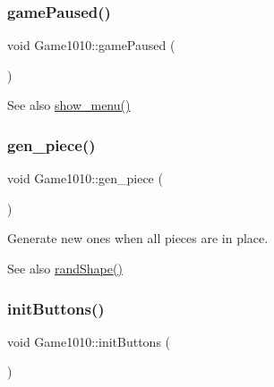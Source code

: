 \subsubsection{\texorpdfstring{game\+Paused()}{gamePaused()}}
{\footnotesize\ttfamily void Game1010\+::game\+Paused (\begin{DoxyParamCaption}{ }\end{DoxyParamCaption})\hspace{0.3cm}{\ttfamily [inline]}}

\begin{DoxySeeAlso}{See also}
\mbox{\hyperlink{class_game1010_a99d6f53c3073861fe37ef67caa073840}{show\+\_\+menu()}} 
\end{DoxySeeAlso}
\mbox{\label{class_game1010_a9576170947a355682c922cb648432b9e}} 
\subsubsection{\texorpdfstring{gen\+\_\+piece()}{gen\_piece()}}
{\footnotesize\ttfamily void Game1010\+::gen\+\_\+piece (\begin{DoxyParamCaption}{ }\end{DoxyParamCaption})\hspace{0.3cm}{\ttfamily [inline]}}



Generate new ones when all pieces are in place. 

\begin{DoxySeeAlso}{See also}
\mbox{\hyperlink{class_game1010_a9af7a5b3b193d6edbefc969b1d756c94}{rand\+Shape()}} 
\end{DoxySeeAlso}
\mbox{\label{class_game1010_a94c89079a87b30e7f4813d40283dd4ad}} 
\subsubsection{\texorpdfstring{init\+Buttons()}{initButtons()}}
{\footnotesize\ttfamily void Game1010\+::init\+Buttons (\begin{DoxyParamCaption}{ }\end{DoxyParamCaption})\hspace{0.3cm}{\ttfamily [inline]}}

